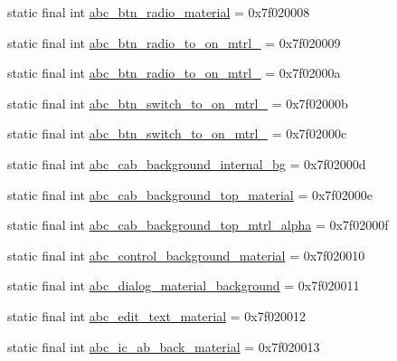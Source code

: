 \begin{CompactItemize}
static final int \hyperlink{classandroid_1_1support_1_1v7_1_1mediarouter_1_1_r_1_1drawable_1dacc6bf19ccdac2d514a2d8c830fec3}{abc\_\-btn\_\-radio\_\-material} = 0x7f020008
\item 
static final int \hyperlink{classandroid_1_1support_1_1v7_1_1mediarouter_1_1_r_1_1drawable_9400b27cef72c731df2b40316f447c84}{abc\_\-btn\_\-radio\_\-to\_\-on\_\-mtrl\_} = 0x7f020009
\item 
static final int \hyperlink{classandroid_1_1support_1_1v7_1_1mediarouter_1_1_r_1_1drawable_aa9911933b95d0aab6596d100a611b5f}{abc\_\-btn\_\-radio\_\-to\_\-on\_\-mtrl\_} = 0x7f02000a
\item 
static final int \hyperlink{classandroid_1_1support_1_1v7_1_1mediarouter_1_1_r_1_1drawable_3115b22458e0651a33ac52ddeaa21415}{abc\_\-btn\_\-switch\_\-to\_\-on\_\-mtrl\_} = 0x7f02000b
\item 
static final int \hyperlink{classandroid_1_1support_1_1v7_1_1mediarouter_1_1_r_1_1drawable_b2a1cdfbbe12065609608d2fc48f4268}{abc\_\-btn\_\-switch\_\-to\_\-on\_\-mtrl\_} = 0x7f02000c
\item 
static final int \hyperlink{classandroid_1_1support_1_1v7_1_1mediarouter_1_1_r_1_1drawable_c751e3e93dcaf1dc9e43234e152d0c73}{abc\_\-cab\_\-background\_\-internal\_\-bg} = 0x7f02000d
\item 
static final int \hyperlink{classandroid_1_1support_1_1v7_1_1mediarouter_1_1_r_1_1drawable_7032ce6e387b456cf4b8ec15ec86937e}{abc\_\-cab\_\-background\_\-top\_\-material} = 0x7f02000e
\item 
static final int \hyperlink{classandroid_1_1support_1_1v7_1_1mediarouter_1_1_r_1_1drawable_a1d30b9537b40d6116f84f31011a6535}{abc\_\-cab\_\-background\_\-top\_\-mtrl\_\-alpha} = 0x7f02000f
\item 
static final int \hyperlink{classandroid_1_1support_1_1v7_1_1mediarouter_1_1_r_1_1drawable_6287fc43308443e4d3a824782e99b4bc}{abc\_\-control\_\-background\_\-material} = 0x7f020010
\item 
static final int \hyperlink{classandroid_1_1support_1_1v7_1_1mediarouter_1_1_r_1_1drawable_df5713c92593490aa1c7b4821b33f986}{abc\_\-dialog\_\-material\_\-background} = 0x7f020011
\item 
static final int \hyperlink{classandroid_1_1support_1_1v7_1_1mediarouter_1_1_r_1_1drawable_1d457bfcaaca3f46056853009a6a3e75}{abc\_\-edit\_\-text\_\-material} = 0x7f020012
\item 
static final int \hyperlink{classandroid_1_1support_1_1v7_1_1mediarouter_1_1_r_1_1drawable_7a0e9b6ba1eeca9f35083063265359fc}{abc\_\-ic\_\-ab\_\-back\_\-material} = 0x7f020013

\end{CompactItemize}
